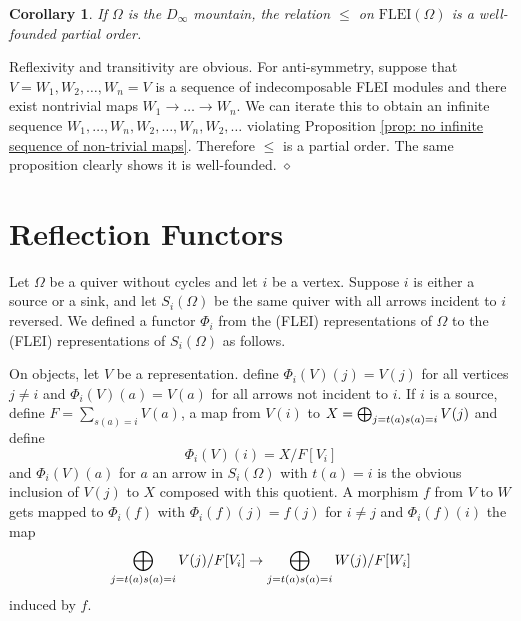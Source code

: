 \documentclass{article}
\newtheorem{corollary}{Corollary}[section]
\newenvironment{proof}{\vspace*{2ex}\noindent {\em Proof:}
}{\hfill $\diamond$ \\[2ex]}
\begin{document}


\begin{corollary}\label{cor: the mountain is well-founded}
    If $\Omega$ is the $D_\infty$ mountain, the relation $\leq$ on $\text{FLEI}(\Omega)$ is a well-founded partial order.
\end{corollary}


\begin{proof}
Reflexivity and transitivity are obvious. For anti-symmetry, suppose that $V = W_1 , W_2, \ldots, W_n = V$ is a sequence of indecomposable FLEI modules and there exist nontrivial maps $W_1 \to \ldots \to W_n$. We can iterate this to obtain an infinite sequence $W_1, \ldots, W_n , W_2, \ldots, W_n, W_2, \ldots$ violating Proposition \ref{prop: no infinite sequence of non-trivial maps}. Therefore $\leq$ is a partial order. The same proposition clearly shows it is well-founded. 
\end{proof}


\section{Reflection Functors} \label{sec: reflection functors}




Let $\Omega$ be a quiver without cycles and let $i$ be a vertex. Suppose $i$ is either a source or a sink, and let $S_i(\Omega)$ be the same quiver with all arrows incident to $i$ reversed.  We defined a functor $\Phi_i$ from the (FLEI) representations of $\Omega$ to the (FLEI) representations of $S_i(\Omega)$ as follows.

On objects, let $V$ be a representation. define $\Phi_i(V)(j) = V(j)$ for all vertices $j \neq i$ and $\Phi_i(V)(a)=V(a)$ for all arrows not incident to $i$.  If $i$ is a source, define $F=\sum_{s(a)=i} V(a)$, a map from $V(i)$ to $X=\bigoplus_{j=t(a)\\s(a)=i} V(j)$ and define
\[\Phi_i(V)(i)= X/F[V_i]\]
and $\Phi_i(V)(a)$ for $a$ an arrow in $S_i(\Omega)$ with $t(a)=i$ is the obvious inclusion of  $V(j)$ to $X$ composed with this quotient.  A morphism $f$ from $V$ to $W$ gets mapped to $\Phi_i(f)$ with $\Phi_i(f)(j)=f(j)$ for $i \neq j$ and $\Phi_i(f)(i)$ the map
\[\bigoplus_{j=t(a)\\s(a)=i} V(j)/F[V_i] \to \bigoplus_{j=t(a)\\s(a)=i} W(j)/F[W_i]\]
induced by $f$.
\end{document}
